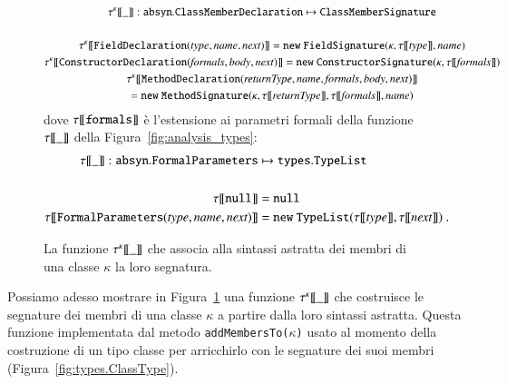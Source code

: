 \begin{figure}
{\small
\begin{multline*}
  \sig{\kappa}{\_}:\mathtt{absyn.ClassMemberDeclaration}\mapsto\mathtt{ClassMemberSignature}\\
  \mbox{}\\
  \sig{\kappa}{\mathtt{FieldDeclaration(\mathit{type},\mathit{name},\mathit{next})}}
    =\mathtt{new\ FieldSignature(\kappa,\st{\mathit{type}},\mathit{name})}\\
  \sig{\kappa}{\mathtt{ConstructorDeclaration(\mathit{formals},\mathit{body},\mathit{next})}}
    =\mathtt{new\ ConstructorSignature(\kappa,\st{\mathit{formals}})}\\
  \sig{\kappa}{\mathtt{MethodDeclaration(\mathit{returnType},\mathit{name},\mathit{formals},\mathit{body},\mathit{next})}}\\
    =\mathtt{new\ MethodSignature(\kappa,\st{\mathit{returnType}},\st{\mathit{formals}},\mathit{name})}
\end{multline*}
%
dove ${\tau[\![{\mathtt{formals}}]\!]}$ \`e l'estensione ai parametri formali della
funzione ${\tau[\![{\_}]\!]}$ della Figura~\ref{fig:analysis_types}:
%
\begin{align*}
  \st{\_}:\mathtt{absyn.FormalParameters}&\mapsto\mathtt{types.TypeList}\\
  \mbox{}\\
  \st{\mathtt{null}}&=\mathtt{null}\\
  \st{\mathtt{FormalParameters(\mathit{type},\mathit{name},\mathit{next})}}&=
    \mathtt{new\ TypeList(\st{\mathit{type}},\st{\mathit{next}})}~.
\end{align*}
}
\caption{La funzione ${\tau^{\kappa}[\![{\_}]\!]}$ che associa alla sintassi astratta dei membri di una classe $\kappa$ la loro segnatura.}\label{fig:signatures_definition}
\end{figure}
%
Possiamo adesso mostrare in Figura~\ref{fig:signatures_definition} una funzione
${\tau^{\kappa}[\![{\_}]\!]}$ che costruisce le segnature dei
membri di una classe $\kappa$ a partire dalla loro sintassi astratta.
Questa funzione \e implementata dal metodo \texttt{addMembersTo($\kappa$)}
usato al momento della costruzione di un tipo classe per arricchirlo
con le segnature dei suoi membri (Figura~\ref{fig:types.ClassType}).
%
